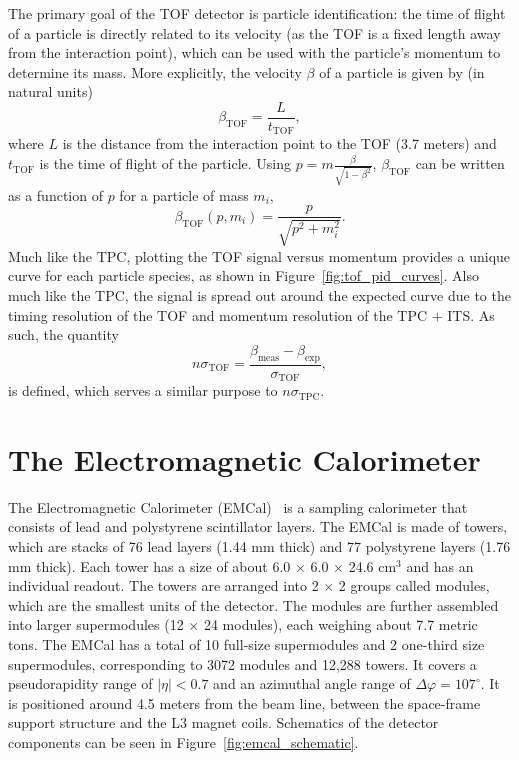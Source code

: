 The primary goal of the TOF detector is particle identification: the time of flight of a particle is directly related to its velocity (as the TOF is a fixed length away from the interaction point), which can be used with the particle's momentum to determine its mass. More explicitly, the velocity $\beta$ of a particle is given by (in natural units)
\begin{equation}
    \beta_{\text{TOF}} = \frac{L}{t_{\text{TOF}}},
\end{equation}
where $L$ is the distance from the interaction point to the TOF (3.7 meters) and $t_{\text{TOF}}$ is the time of flight of the particle. Using $p =  m \frac{\beta}{\sqrt{1-\beta^2}}$, $\beta_{\text{TOF}}$ can be written as a function of $p$ for a particle of mass $m_i$,
\begin{equation}
    \beta_{\text{TOF}}(p, m_i) = \frac{p}{\sqrt{p^2 + m_i^2}}.
\end{equation}
Much like the TPC, plotting the TOF signal versus momentum provides a unique curve for each particle species, as shown in Figure~\ref{fig:tof_pid_curves}. Also much like the TPC, the signal is spread out around the expected curve due to the timing resolution of the TOF and momentum resolution of the TPC $+$ ITS. As such, the quantity
\begin{equation}
n\sigma_{\text{TOF}} = \frac{\beta_{\text{meas}} - \beta_{\text{exp}}}{\sigma_{\text{TOF}}},
\end{equation}
is defined, which serves a similar purpose to $n\sigma_{\text{TPC}}$.



\section{The Electromagnetic Calorimeter}

The Electromagnetic Calorimeter (EMCal)~\cite{EMCAL1, EMCAL2} is a sampling calorimeter that consists of lead and polystyrene scintillator layers. The EMCal is made of towers, which are stacks of 76 lead layers (1.44 mm thick) and 77 polystyrene layers (1.76 mm thick). Each tower has a size of about 6.0 $\times$ 6.0 $\times$ 24.6 cm$^3$ and has an individual readout. The towers are arranged into 2 $\times$ 2 groups called modules, which are the smallest units of the detector. The modules are further assembled into larger supermodules (12 $\times$ 24 modules), each weighing about 7.7 metric tons. The EMCal has a total of 10 full-size supermodules and 2 one-third size supermodules, corresponding to 3072 modules and 12,288 towers. It covers a pseudorapidity range of $|\eta| < 0.7$ and an azimuthal angle range of  $\Delta\varphi = 107^\circ$. It is positioned around 4.5 meters from the beam line, between the space-frame support structure and the L3 magnet coils. Schematics of the detector components can be seen in Figure~\ref{fig:emcal_schematic}.

